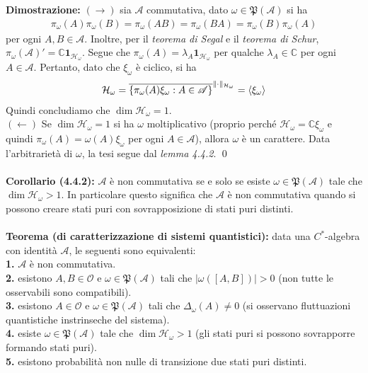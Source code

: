 \documentclass{article}
\numberwithin{equation}{subsection}
\begin{document}
\textbf{Dimostrazione:} $(\rightarrow)$ sia $\mathscr{A}$ commutativa, dato $\omega \in \mathfrak{P}(\mathscr{A})$ si ha
\begin{align*}
    \pi_\omega(A)\pi_\omega(B) = \pi_\omega(AB) = \pi_\omega(BA) = \pi_\omega(B)\pi_\omega(A)
\end{align*}
per ogni $A, B \in \mathscr{A}$. Inoltre, per il \textit{teorema di Segal} e il \textit{teorema di Schur}, $\pi_\omega(\mathscr{A})' = \mathbb{C}\mathbf{1}_{\mathcal{H}_\omega}$. Segue che $\pi_\omega(A) = \lambda_A\mathbf{1}_{\mathcal{H}_\omega}$ per qualche $\lambda_A \in \mathbb{C}$ per ogni $A \in \mathscr{A}$. Pertanto, dato che $\xi_\omega$ è ciclico, si ha
\begin{align*}
    \mathcal{H}_\omega = \overline{\{\pi_\omega(A)\xi_\omega : A \in \mathscr{A}\}}^{\|\cdot\|_{\mathcal{H}_\omega}} = \braket{\xi_\omega}
\end{align*}
Quindi concludiamo che $\dim \mathcal{H}_\omega = 1$. \\
$(\leftarrow)$ Se $\dim \mathcal{H}_\omega = 1$ si ha $\omega$ moltiplicativo (proprio perché $\mathcal{H}_\omega = \mathbb{C}\xi_\omega$ e quindi $\pi_\omega(A) = \omega(A)\xi_\omega$ per ogni $A \in \mathscr{A}$), allora $\omega$ è un carattere. Data l'arbitrarietà di $\omega$, la tesi segue dal \textit{lemma 4.4.2}. \qed \\ \\
\textbf{Corollario (4.4.2):} $\mathscr{A}$ è non commutativa se e solo se esiste $\omega \in \mathfrak{P}(\mathscr{A})$ tale che $\dim \mathcal{H}_\omega > 1$. In particolare questo significa che $\mathscr{A}$ è non commutativa quando si possono creare stati puri con sovrapposizione di stati puri distinti. \\ \\
\textbf{Teorema (di caratterizzazione di sistemi quantistici):} data una $C^*$-algebra con identità $\mathscr{A}$, le seguenti sono equivalenti: \\
\textbf{1.} $\mathscr{A}$ è non commutativa. \\
\textbf{2.} esistono $A, B \in \mathscr{O}$ e $\omega \in \mathfrak{P}(\mathscr{A})$ tali che $|\omega([A, B])| > 0$ (non tutte le osservabili sono compatibili). \\
\textbf{3.} esistono $A \in \mathscr{O}$ e $\omega \in \mathfrak{P}(\mathscr{A})$ tali che $\Delta_\omega(A) \neq 0$ (si osservano fluttuazioni quantistiche instrinseche del sistema). \\
\textbf{4.} esiste $\omega \in \mathfrak{P}(\mathscr{A})$ tale che $\dim \mathcal{H}_\omega > 1$ (gli stati puri si possono sovrapporre formando stati puri). \\
\textbf{5.} esistono probabilità non nulle di transizione due stati puri distinti. \\
\end{document}
